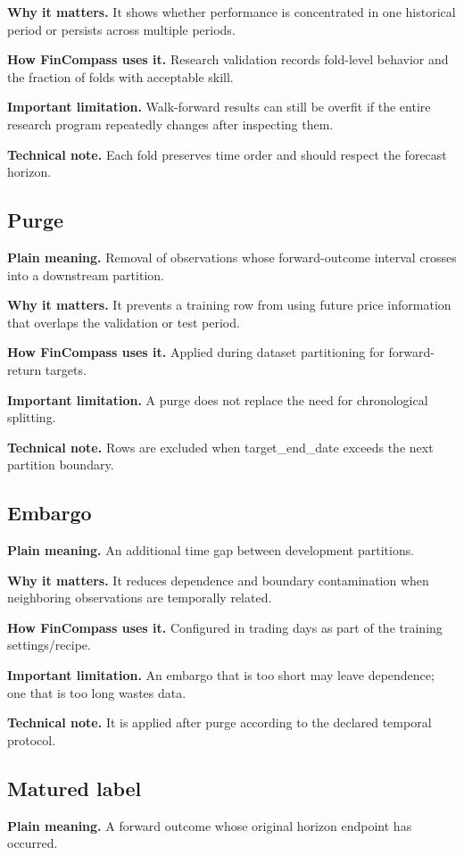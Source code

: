 \documentclass[11pt]{article}
\begin{document}
\textbf{Why it matters.} It shows whether performance is concentrated in one historical period or persists across multiple periods.

\textbf{How FinCompass uses it.} Research validation records fold-level behavior and the fraction of folds with acceptable skill.

\textbf{Important limitation.} Walk-forward results can still be overfit if the entire research program repeatedly changes after inspecting them.

\textbf{Technical note.} Each fold preserves time order and should respect the forecast horizon.

\subsection{Purge}
\textbf{Plain meaning.} Removal of observations whose forward-outcome interval crosses into a downstream partition.

\textbf{Why it matters.} It prevents a training row from using future price information that overlaps the validation or test period.

\textbf{How FinCompass uses it.} Applied during dataset partitioning for forward-return targets.

\textbf{Important limitation.} A purge does not replace the need for chronological splitting.

\textbf{Technical note.} Rows are excluded when target\_end\_date exceeds the next partition boundary.

\subsection{Embargo}
\textbf{Plain meaning.} An additional time gap between development partitions.

\textbf{Why it matters.} It reduces dependence and boundary contamination when neighboring observations are temporally related.

\textbf{How FinCompass uses it.} Configured in trading days as part of the training settings/recipe.

\textbf{Important limitation.} An embargo that is too short may leave dependence; one that is too long wastes data.

\textbf{Technical note.} It is applied after purge according to the declared temporal protocol.

\subsection{Matured label}
\textbf{Plain meaning.} A forward outcome whose original horizon endpoint has occurred.
\end{document}
